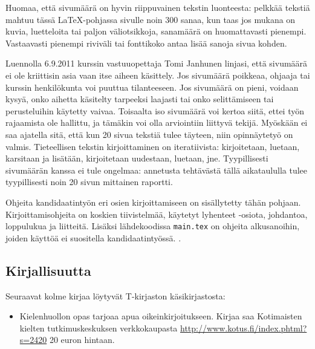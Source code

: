 Huomaa, että sivumäärä on hyvin riippuvainen tekstin luonteesta:
pelkkää tekstiä mahtuu tässä \LaTeX{}-pohjassa sivulle noin 300 sanaa,
kun taas jos mukana on kuvia, luetteloita tai paljon väliotsikkoja,
sanamäärä on huomattavasti pienempi. Vastaavasti pienempi riviväli tai
fonttikoko antaa lisää sanoja sivua kohden.

Luennolla 6.9.2011 kurssin vastuuopettaja Tomi Janhunen linjasi, että
sivumäärä ei ole kriittisin asia vaan itse aiheen käsittely.  Jos
sivumäärä poikkeaa, ohjaaja tai kurssin henkilökunta voi puuttua
tilanteeseen. Jos sivumäärä on pieni, voidaan kysyä, onko aihetta
käsitelty tarpeeksi laajasti tai onko selittämiseen tai perusteluihin
käytetty vaivaa. Toisaalta iso sivumäärä voi kertoa siitä, ettei työn
rajaamista ole hallittu, ja tämäkin voi olla arviointiin liittyvä
tekijä. Myöskään ei saa ajatella sitä, että kun 20 sivua tekstiä tulee
täyteen, niin opinnäytetyö on valmis. Tieteellisen tekstin
kirjoittaminen on iteratiivista: kirjoitetaan, luetaan, karsitaan ja
lisätään, kirjoitetaan uudestaan, luetaan, jne. Tyypillisesti
sivumäärän kanssa ei tule ongelmaa: annetusta tehtävästä tällä
aikataululla tulee tyypillisesti noin 20 sivun mittainen raportti.

Ohjeita kandidaatintyön eri osien kirjoittamiseen on sisällytetty
tähän pohjaan. Kirjoittamisohjeita on koskien tiivistelmää, käytetyt
lyhenteet -osiota, johdantoa, loppulukua ja liitteitä.  Lisäksi
lähdekoodissa \verb!main.tex! on ohjeita alkusanoihin, joiden käyttöä
ei suositella kandidaatintyössä.
.


\subsection{Kirjallisuutta}

Seuraavat kolme kirjaa löytyvät T-kirjaston käsikirjastosta:
%
\begin{itemize}


\item Kielenhuollon opas tarjoaa apua
  oikeinkirjoitukseen. Kirjaa saa Kotimaisten kielten
  tutkimuskeskuksen verkkokaupasta
  \url{http://www.kotus.fi/index.phtml?s=2420} 20 euron hintaan.
\end{itemize}


